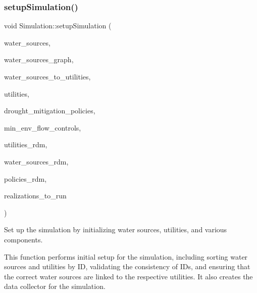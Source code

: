 \subsubsection{\texorpdfstring{setup\+Simulation()}{setupSimulation()}}
{\footnotesize\ttfamily void Simulation\+::setup\+Simulation (\begin{DoxyParamCaption}\item[{vector$<$ \mbox{\hyperlink{classWaterSource}{Water\+Source}} $\ast$$>$ \&}]{water\+\_\+sources,  }\item[{Graph \&}]{water\+\_\+sources\+\_\+graph,  }\item[{const vector$<$ vector$<$ int $>$$>$ \&}]{water\+\_\+sources\+\_\+to\+\_\+utilities,  }\item[{vector$<$ \mbox{\hyperlink{classUtility}{Utility}} $\ast$$>$ \&}]{utilities,  }\item[{const vector$<$ Drought\+Mitigation\+Policy $\ast$$>$ \&}]{drought\+\_\+mitigation\+\_\+policies,  }\item[{vector$<$ Min\+Env\+Flow\+Control $\ast$$>$ \&}]{min\+\_\+env\+\_\+flow\+\_\+controls,  }\item[{vector$<$ vector$<$ double $>$$>$ \&}]{utilities\+\_\+rdm,  }\item[{vector$<$ vector$<$ double $>$$>$ \&}]{water\+\_\+sources\+\_\+rdm,  }\item[{vector$<$ vector$<$ double $>$$>$ \&}]{policies\+\_\+rdm,  }\item[{vector$<$ unsigned long $>$ \&}]{realizations\+\_\+to\+\_\+run }\end{DoxyParamCaption})}



Set up the simulation by initializing water sources, utilities, and various components. 

This function performs initial setup for the simulation, including sorting water sources and utilities by ID, validating the consistency of I\+Ds, and ensuring that the correct water sources are linked to the respective utilities. It also creates the data collector for the simulation.


